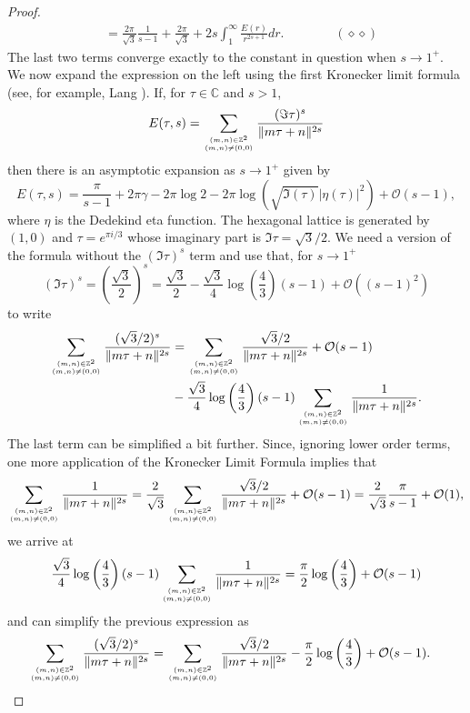 \documentclass[10pt, reqno]{amsart}
\begin{document}
\begin{proof}
\begin{align*}
 &=  \frac{2 \pi}{\sqrt{3}} \frac{1}{s-1} + \frac{2\pi}{\sqrt{3}}  + 2s \int_1^{\infty} \frac{E(r)}{r^{2s + 1}} dr. \qquad \qquad (\diamond \diamond)
 \end{align*}
The last two terms converge exactly to the constant in question when $s \rightarrow 1^+$. We now expand the expression on the left using the first Kronecker limit formula (see, for example, Lang \cite[Chapter 20]{lang}). If, for $\tau \in \mathbb{C}$ and $s > 1$,
$$ E(\tau, s) = \sum_{(m,n) \in \mathbb{Z}^2 \atop (m,n) \neq (0,0)} \frac{(\Im \tau)^s}{\| m \tau + n\|^{2s}}$$
then there is an asymptotic expansion as $s \rightarrow 1^+$ given by
$$ E(\tau, s) = \frac{\pi}{s-1} + 2\pi \gamma - 2\pi \log{2} - 2\pi \log\left( \sqrt{\Im (\tau)} |\eta(\tau)|^2 \right) + \mathcal{O}(s-1),$$
where $\eta$ is the Dedekind eta function. The hexagonal lattice is generated by $(1,0)$ and  $\tau = e^{\pi i/3}$ whose imaginary part is $\Im \tau = \sqrt{3}/2$. We need a version of the formula without the $(\Im \tau)^s$ term and use that, for $s \rightarrow 1^+$
$$ (\Im \tau)^s = \left( \frac{\sqrt{3}}{2}\right)^s =  \frac{\sqrt{3}}{2} - \frac{\sqrt{3}}{4} \log\left(\frac{4}{3}\right) (s-1) + \mathcal{O}((s-1)^2)$$
to write
\begin{align*}
 \sum_{(m,n) \in \mathbb{Z}^2 \atop (m,n) \neq (0,0)} \frac{(\sqrt{3}/2)^s}{\| m \tau + n\|^{2s}} &= \sum_{(m,n) \in \mathbb{Z}^2 \atop (m,n)  \neq (0,0)} \frac{\sqrt{3}/2}{\| m \tau + n\|^{2s}} + \mathcal{O}(s-1) \\
 &- \frac{\sqrt{3}}{4} \log\left(\frac{4}{3}\right) (s-1)  \sum_{(m,n) \in \mathbb{Z}^2 \atop (m,n) \neq (0,0)} \frac{1}{\| m \tau + n\|^{2s}}.
\end{align*}
The last term can be simplified a bit further.
Since, ignoring lower order terms, one more application of the Kronecker Limit Formula implies that
$$ \sum_{(m,n) \in \mathbb{Z}^2 \atop (m,n) \neq (0,0)} \frac{1}{\| m \tau + n\|^{2s}} = \frac{2}{\sqrt{3}} \sum_{(m,n) \in \mathbb{Z}^2 \atop (m,n) \neq (0,0)} \frac{\sqrt{3}/2}{\| m \tau + n\|^{2s}} + \mathcal{O}(s-1) = \frac{2}{\sqrt{3}} \frac{\pi}{s-1} + \mathcal{O}(1),$$
we arrive at
$$ \frac{\sqrt{3}}{4} \log\left(\frac{4}{3}\right) (s-1)  \sum_{(m,n) \in \mathbb{Z}^2 \atop (m,n) \neq (0,0)} \frac{1}{\| m \tau + n\|^{2s}} = \frac{\pi}{2} \log\left(\frac{4}{3}\right) + \mathcal{O}(s-1)
 $$
 and can simplify the previous expression as
 \begin{align*}
 \sum_{(m,n) \in \mathbb{Z}^2 \atop (m,n) \neq (0,0)} \frac{(\sqrt{3}/2)^s}{\| m \tau + n\|^{2s}} &= \sum_{(m,n) \in \mathbb{Z}^2 \atop (m,n)  \neq (0,0)} \frac{\sqrt{3}/2}{\| m \tau + n\|^{2s}}  - \frac{\pi}{2}\log\left(\frac{4}{3}\right) + \mathcal{O}(s-1).  
\end{align*}
 

\end{proof}
\end{document}
